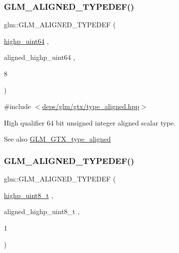 \subsubsection{\texorpdfstring{G\+L\+M\+\_\+\+A\+L\+I\+G\+N\+E\+D\+\_\+\+T\+Y\+P\+E\+D\+E\+F()}{GLM\_ALIGNED\_TYPEDEF()}\hspace{0.1cm}{\footnotesize\ttfamily [96/209]}}
{\footnotesize\ttfamily glm\+::\+G\+L\+M\+\_\+\+A\+L\+I\+G\+N\+E\+D\+\_\+\+T\+Y\+P\+E\+D\+EF (\begin{DoxyParamCaption}\item[{\hyperlink{group__gtc__type__precision_ga8079c653e20cda03d34b99de629a7b09}{highp\+\_\+uint64}}]{,  }\item[{aligned\+\_\+highp\+\_\+uint64}]{,  }\item[{8}]{ }\end{DoxyParamCaption})}



{\ttfamily \#include $<$\hyperlink{gtx_2type__aligned_8hpp}{deps/glm/gtx/type\+\_\+aligned.\+hpp}$>$}

High qualifier 64 bit unsigned integer aligned scalar type. \begin{DoxySeeAlso}{See also}
\hyperlink{group__gtx__type__aligned}{G\+L\+M\+\_\+\+G\+T\+X\+\_\+type\+\_\+aligned} 
\end{DoxySeeAlso}
\mbox{\label{group__gtx__type__aligned_gaff50b10dd1c48be324fdaffd18e2c7ea}} 
\subsubsection{\texorpdfstring{G\+L\+M\+\_\+\+A\+L\+I\+G\+N\+E\+D\+\_\+\+T\+Y\+P\+E\+D\+E\+F()}{GLM\_ALIGNED\_TYPEDEF()}\hspace{0.1cm}{\footnotesize\ttfamily [97/209]}}
{\footnotesize\ttfamily glm\+::\+G\+L\+M\+\_\+\+A\+L\+I\+G\+N\+E\+D\+\_\+\+T\+Y\+P\+E\+D\+EF (\begin{DoxyParamCaption}\item[{\hyperlink{group__gtc__type__precision_ga9ba529fcc75b82d23da979f0ce6e4518}{highp\+\_\+uint8\+\_\+t}}]{,  }\item[{aligned\+\_\+highp\+\_\+uint8\+\_\+t}]{,  }\item[{1}]{ }\end{DoxyParamCaption})}



